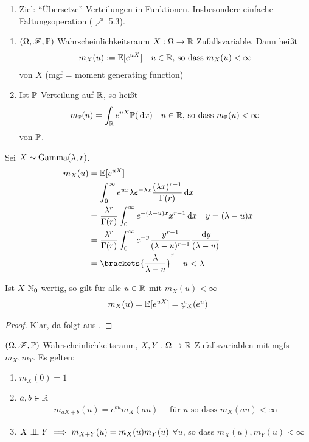 \begin{enumerate}[label=]
	\item \ul{Ziel:} ``Übersetze'' Verteilungen in Funktionen. Insbesondere einfache Faltungsoperation ($\nearrow$ 5.3). %
\end{enumerate}
\begin{definition}
	\begin{enumerate}
		\item $(\O,\F,\P)$ Wahrscheinlichkeitsraum $X: \O \to \R$ Zufallsvariable. Dann heißt
		\begin{align*}
			m_X(u) := \E[e^{uX}] \quad u\in \R\text{, so dass } m_X(u) < \infty
		\end{align*}
		 von $X$ (mgf = moment generating function)
		\item Ist $\P$ Verteilung auf $\R$, so heißt
		\begin{align*}
			m_{\P}(u) = \int_{\R}e^{uX} \P(\d x) \quad u \in \R\text{, so dass } m_{\P}(u) < \infty
		\end{align*}
		 von $\P$.
	\end{enumerate}
\end{definition}
\begin{example}
	Sei $X \sim \Gam(\lambda,r)$.
	\begin{align*}
		m_X(u) &= \E[e^{uX}]\\
		&= \int_{0}^{\infty} e^{ux}\lambda e^{-\lambda x}\frac{(\lambda x)^{r-1}}{\Gamma(r)}\d x\\
		&= \frac{\lambda^r}{\Gamma(r)} \int_{0}^{\infty}e^{-(\lambda-u)x}x^{r-1}\d x \quad y= (\lambda-u)x\\
		&= \frac{\lambda^r}{\Gamma(r)}\int_0^{\infty} e^{-y}\frac{y^{r-1}}{(\lambda-u)^{r-1}}\frac{\d y}{(\lambda-u)}\\
		&= \brackets{\frac{\lambda}{\lambda-u}}^r \quad u < \lambda
	\end{align*}
\end{example}
\begin{lemma}
	Ist $X$ $\N_0$-wertig, so gilt für alle $u \in \R$ mit $m_X(u) < \infty$
	\begin{align*}
		m_X(u) = \E[e^{uX}] = \psi_X(e^u)
	\end{align*}
\end{lemma}
\begin{proof}
	Klar, da folgt aus .
\end{proof}
\begin{proposition}
	$(\O,\F,\P)$ Wahrscheinlichkeitsraum, $X,Y: \O \to \R$ Zufallsvariablen mit mgfs $m_X,m_Y$. Es gelten:
	\begin{enumerate}
		\item $m_X(0) = 1$
		\item $a,b \in \R$
		\begin{align*}
			m_{aX+b}(u) = e^{bu}m_X(au) \quad \text{ für } u \text{ so dass } m_X(au) < \infty
		\end{align*}
		\item $X \upmodels Y \implies m_{X+Y}(u) = m_X(u)m_Y(u)$ $\forall u$, so dass $m_X(u), m_Y(u) < \infty$ 
	\end{enumerate}
\end{proposition}
